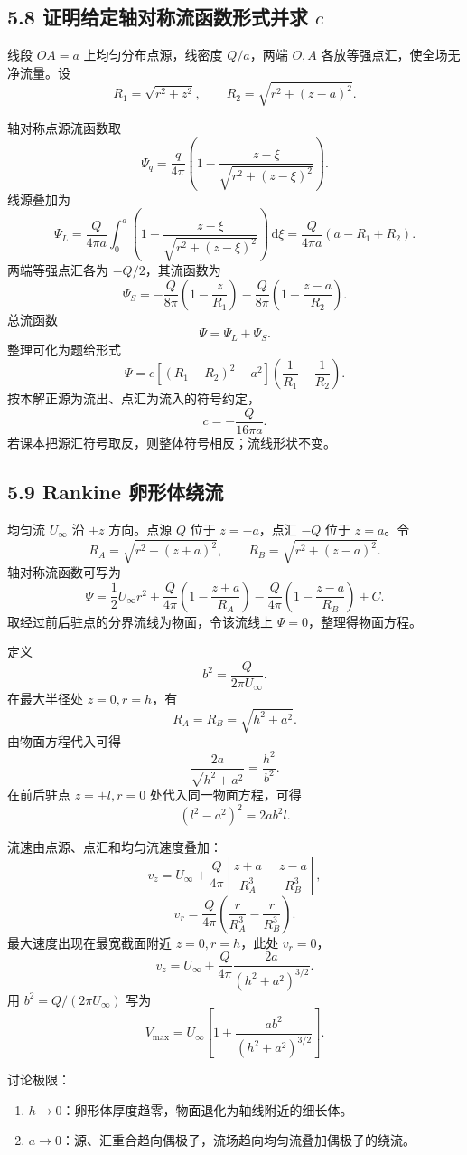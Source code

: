 \documentclass[UTF8,zihao=-4]{ctexart}
\newcommand{\dd}{\,\mathrm d}
\begin{document}
\subsection*{5.8 证明给定轴对称流函数形式并求 \(c\)}

线段 \(OA=a\) 上均匀分布点源，线密度 \(Q/a\)，两端 \(O,A\) 各放等强点汇，使全场无净流量。设
\[
R_1=\sqrt{r^2+z^2},\qquad
R_2=\sqrt{r^2+(z-a)^2}.
\]

轴对称点源流函数取
\[
\Psi_q=\frac{q}{4\pi}\left(1-\frac{z-\xi}{\sqrt{r^2+(z-\xi)^2}}\right).
\]
线源叠加为
\[
\Psi_L=\frac{Q}{4\pi a}\int_0^a
\left(1-\frac{z-\xi}{\sqrt{r^2+(z-\xi)^2}}\right)\dd\xi
=\frac{Q}{4\pi a}(a-R_1+R_2).
\]
两端等强点汇各为 \(-Q/2\)，其流函数为
\[
\Psi_S=-\frac{Q}{8\pi}\left(1-\frac{z}{R_1}\right)
-\frac{Q}{8\pi}\left(1-\frac{z-a}{R_2}\right).
\]
总流函数
\[
\Psi=\Psi_L+\Psi_S.
\]
整理可化为题给形式
\[
\Psi=c\left[(R_1-R_2)^2-a^2\right]
\left(\frac1{R_1}-\frac1{R_2}\right).
\]
按本解正源为流出、点汇为流入的符号约定，
\[
\boxed{c=-\frac{Q}{16\pi a}.}
\]
若课本把源汇符号取反，则整体符号相反；流线形状不变。

\subsection*{5.9 Rankine 卵形体绕流}

均匀流 \(U_\infty\) 沿 \(+z\) 方向。点源 \(Q\) 位于 \(z=-a\)，点汇 \(-Q\) 位于 \(z=a\)。令
\[
R_A=\sqrt{r^2+(z+a)^2},\qquad
R_B=\sqrt{r^2+(z-a)^2}.
\]
轴对称流函数可写为
\[
\Psi=\frac12U_\infty r^2
+\frac{Q}{4\pi}\left(1-\frac{z+a}{R_A}\right)
-\frac{Q}{4\pi}\left(1-\frac{z-a}{R_B}\right)+C .
\]
取经过前后驻点的分界流线为物面，令该流线上 \(\Psi=0\)，整理得物面方程。

定义
\[
b^2=\frac{Q}{2\pi U_\infty}.
\]
在最大半径处 \(z=0,r=h\)，有
\[
R_A=R_B=\sqrt{h^2+a^2}.
\]
由物面方程代入可得
\[
\boxed{
\frac{2a}{\sqrt{h^2+a^2}}=\frac{h^2}{b^2}.}
\]
在前后驻点 \(z=\pm l,r=0\) 处代入同一物面方程，可得
\[
\boxed{(l^2-a^2)^2=2ab^2l.}
\]

流速由点源、点汇和均匀流速度叠加：
\[
v_z=U_\infty+\frac{Q}{4\pi}
\left[\frac{z+a}{R_A^3}-\frac{z-a}{R_B^3}\right],
\]
\[
v_r=\frac{Q}{4\pi}\left(\frac{r}{R_A^3}-\frac{r}{R_B^3}\right).
\]
最大速度出现在最宽截面附近 \(z=0,r=h\)，此处 \(v_r=0\)，
\[
v_z=U_\infty+\frac{Q}{4\pi}\frac{2a}{(h^2+a^2)^{3/2}}.
\]
用 \(b^2=Q/(2\pi U_\infty)\) 写为
\[
\boxed{
V_{\max}=U_\infty\left[
1+\frac{ab^2}{(h^2+a^2)^{3/2}}
\right].}
\]

讨论极限：
\begin{enumerate}
  \item \(h\to0\)：卵形体厚度趋零，物面退化为轴线附近的细长体。
  \item \(a\to0\)：源、汇重合趋向偶极子，流场趋向均匀流叠加偶极子的绕流。
\end{enumerate}
\end{document}
